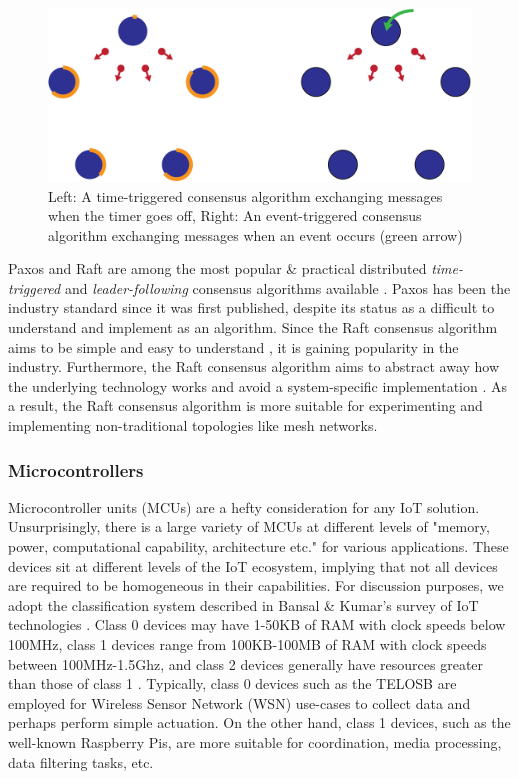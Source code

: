 \begin{figure}[H]
    \centering
    \includegraphics[width=0.4\columnwidth]{final-proposal/images/consensus_time_based_and_evevent_based.png}
    \caption{Left: A time-triggered consensus algorithm exchanging messages when the timer goes off, Right: An event-triggered consensus algorithm exchanging messages when an event occurs (green arrow)}
    \label{fig:consensus_time_based_and_evevent_based}
\end{figure}

Paxos and Raft are among the most popular \& practical distributed \emph{time-triggered} and \emph{leader-following} consensus algorithms available \cite{paxos_vs_raft}. Paxos has been the industry standard since it was first published, despite its status as a difficult to understand and implement as an algorithm. Since the Raft consensus algorithm aims to be simple and easy to understand \cite{raft_paper}, it is gaining popularity in the industry. Furthermore, the Raft consensus algorithm aims to abstract away how the underlying technology works and avoid a system-specific implementation \cite{paxos_vs_raft}. As a result, the Raft consensus algorithm is more suitable for experimenting and implementing non-traditional topologies like mesh networks.

\subsubsection{Microcontrollers}
Microcontroller units (MCUs) are a hefty consideration for any IoT solution. Unsurprisingly, there is a large variety of MCUs at different levels of "memory, power, computational capability, architecture etc." \cite{bansal2020iotsurveydevices} for various applications. These devices sit at different levels of the IoT ecosystem, implying that not all devices are required to be homogeneous in their capabilities. For discussion purposes, we adopt the classification system described in Bansal & Kumar's survey of IoT technologies \cite{bansal2020iotsurveydevices}. Class 0 devices may have 1-50KB of RAM with clock speeds below 100MHz, class 1 devices range from 100KB-100MB of RAM with clock speeds between 100MHz-1.5Ghz, and class 2 devices generally have resources greater than those of class 1 \cite{bansal2020iotsurveydevices}. Typically, class 0 devices such as the TELOSB are employed for Wireless Sensor Network (WSN) use-cases to collect data and perhaps perform simple actuation. On the other hand, class 1 devices, such as the well-known Raspberry Pis, are more suitable for coordination, media processing, data filtering tasks, etc.

